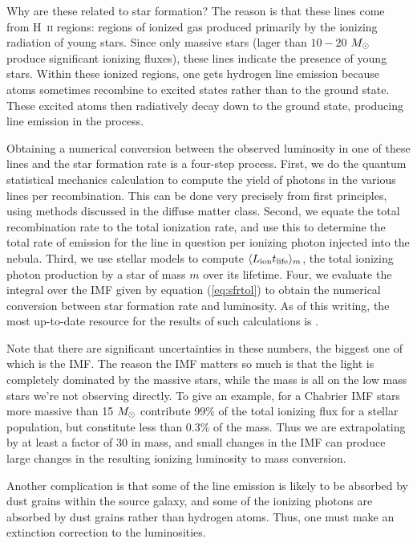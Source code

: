 Why are these related to star formation? The reason is that these lines come from H~\textsc{ii} regions: regions of ionized gas produced primarily by the ionizing radiation of young stars. Since only massive stars (lager than $10-20$ $M_{\odot}$ produce significant ionizing fluxes), these lines indicate the presence of young stars. Within these ionized regions, one gets hydrogen line emission because atoms sometimes recombine to excited states rather than to the ground state. These excited atoms then radiatively decay down to the ground state, producing line emission in the process.

Obtaining a numerical conversion between the observed luminosity in one of these lines and the star formation rate is a four-step process. First, we do the quantum statistical mechanics calculation to compute the yield of photons in the various lines per recombination. This can be done very precisely from first principles, using methods discussed in the diffuse matter class. Second, we equate the total recombination rate to the total ionization rate, and use this to determine the total rate of emission for the line in question per ionizing photon injected into the nebula. Third, we use stellar models to compute $\langle L_{\rm ion} t_{\rm life}\rangle_m$, the total ionizing photon production by a star of mass $m$ over its lifetime. Four, we evaluate the integral over the IMF given by equation (\ref{eq:sfrtol}) to obtain the numerical conversion between star formation rate and luminosity. As of this writing, the most up-to-date resource for the results of such calculations is \citet{kennicutt12a}.

Note that there are significant uncertainties in these numbers, the biggest one of which is the IMF. The reason the IMF matters so much is that the light is completely dominated by the massive stars, while the mass is all on the low mass stars we're not observing directly. To give an example, for a Chabrier IMF stars more massive than 15 $M_{\odot}$ contribute 99\% of the total ionizing flux for a stellar population, but constitute less than 0.3\% of the mass. Thus we are extrapolating by at least a factor of 30 in mass, and small changes in the IMF can produce large changes in the resulting ionizing luminosity to mass conversion.

Another complication is that some of the line emission is likely to be absorbed by dust grains within the source galaxy, and some of the ionizing photons are absorbed by dust grains rather than hydrogen atoms. Thus, one must make an extinction correction to the luminosities.

